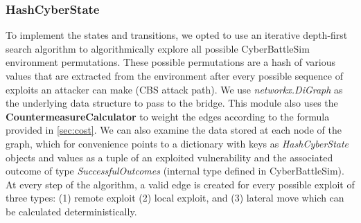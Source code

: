 \subsubsection{HashCyberState}
To implement the states and transitions, we opted to use an iterative depth-first search algorithm to algorithmically explore all possible CyberBattleSim environment permutations. These possible permutations are a hash of various values that are extracted from the environment after every possible sequence of exploits an attacker can make (CBS attack path). We use \textit{networkx.DiGraph} as the underlying data structure to pass to the bridge. This module also uses the \textbf{CountermeasureCalculator} to weight the edges according to the formula provided in \ref{sec:cost}. We can also examine the data stored at each node of the graph, which for convenience points to a dictionary with keys as \textit{HashCyberState} objects and values as a tuple of an exploited vulnerability and the associated outcome of type \textit{SuccessfulOutcomes} (internal type defined in CyberBattleSim). At every step of the algorithm, a valid edge is created for every possible exploit of three types: (1) remote exploit (2) local exploit, and (3) lateral move which can be calculated deterministically.


